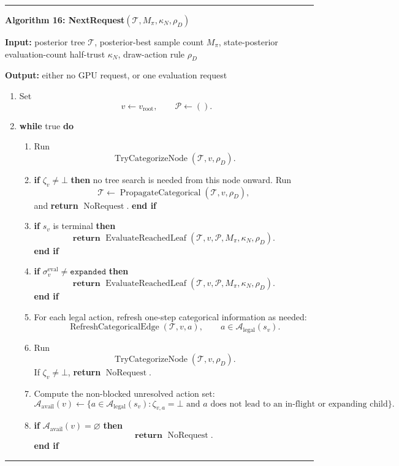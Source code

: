 \documentclass[11pt]{article}
\newcommand{\Tree}{\mathcal{T}}
\newcommand{\Path}{\mathcal{P}}
\newcommand{\Legal}{\mathcal{A}_{\mathrm{legal}}}
\newcommand{\Available}{\mathcal{A}_{\mathrm{avail}}}
\newcommand{\EvaluateReachedLeaf}{\operatorname{EvaluateReachedLeaf}}
\newcommand{\NoRequest}{\operatorname{NoRequest}}
\newcommand{\RefreshCategoricalEdge}{\operatorname{RefreshCategoricalEdge}}
\newcommand{\TryCategorizeNode}{\operatorname{TryCategorizeNode}}
\newcommand{\PropagateCategorical}{\operatorname{PropagateCategorical}}
\newenvironment{algorithmblock}[1]
{
  \par\medskip
  \noindent\hrule\par\smallskip
  \noindent\textbf{#1}
  \par\smallskip
}
{
  \par\smallskip\noindent\hrule\par\medskip
}
\newcommand{\Input}{\textbf{Input: }}
\newcommand{\Output}{\textbf{Output: }}
\newcommand{\Return}{\textbf{return }}
\newcommand{\If}{\textbf{if }}
\newcommand{\Then}{\textbf{ then }}
\newcommand{\EndIf}{\textbf{end if}}
\newcommand{\While}{\textbf{while }}
\newcommand{\Do}{\textbf{ do }}
\begin{document}
\begin{algorithmblock}{Algorithm 16: NextRequest\((\Tree,M_\pi,\kappa_N,\rho_D)\)}

\Input posterior tree \(\Tree\), posterior-best sample count \(M_\pi\), state-posterior evaluation-count half-trust \(\kappa_N\), draw-action rule \(\rho_D\)

\Output either no GPU request, or one evaluation request

\begin{enumerate}[leftmargin=2em]
  \item Set
  \[
  v \gets v_{\mathrm{root}},
  \qquad
  \Path \gets ().
  \]

  \item \While true \Do

  \begin{enumerate}[leftmargin=2em]
    \item Run
    \[
    \TryCategorizeNode(\Tree,v,\rho_D).
    \]

    \item \If \(\zeta_v\ne\bot\) \Then
    no tree search is needed from this node onward. Run
    \[
    \Tree\gets\PropagateCategorical(\Tree,v,\rho_D),
    \]
    and \Return \(\NoRequest\). \EndIf

    \item \If \(s_v\) is terminal \Then
    \[
    \Return
    \EvaluateReachedLeaf(\Tree,v,\Path,M_\pi,\kappa_N,\rho_D).
    \]
    \EndIf

    \item \If \(\sigma^{\mathrm{eval}}_v\ne\texttt{expanded}\) \Then
    \[
    \Return
    \EvaluateReachedLeaf(\Tree,v,\Path,M_\pi,\kappa_N,\rho_D).
    \]
    \EndIf

    \item For each legal action, refresh one-step categorical information as
    needed:
    \[
    \RefreshCategoricalEdge(\Tree,v,a),
    \qquad a\in\Legal(s_v).
    \]

    \item Run
    \[
    \TryCategorizeNode(\Tree,v,\rho_D).
    \]
    If \(\zeta_v\ne\bot\), \Return \(\NoRequest\).

    \item Compute the non-blocked unresolved action set:
    \[
    \Available(v)
    \gets
    \{a\in\Legal(s_v):\zeta_{v,a}=\bot
    \text{ and }a\text{ does not lead to an in-flight or expanding child}\}.
    \]

    \item \If \(\Available(v)=\varnothing\) \Then
    \[
    \Return \NoRequest.
    \]
    \EndIf


\end{enumerate}
\end{enumerate}
\end{algorithmblock}
\end{document}
